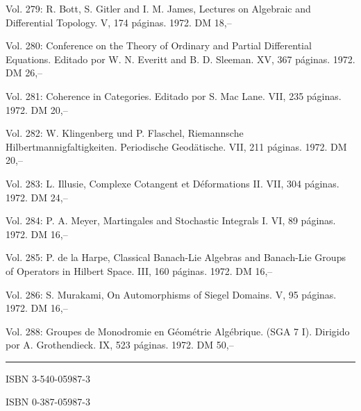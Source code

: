 Vol. 279: R. Bott, S. Gitler and I. M. James, Lectures on Algebraic and Differential Topology. V, 174 páginas. 1972. DM 18,--

Vol. 280: Conference on the Theory of Ordinary and Partial Differential Equations. Editado por W. N. Everitt and B. D. Sleeman. XV, 367 páginas. 1972. DM 26,--

Vol. 281: Coherence in Categories. Editado por S. Mac Lane. VII, 235 páginas. 1972. DM 20,--

Vol. 282: W. Klingenberg und P. Flaschel, Riemannsche Hilbertmannigfaltigkeiten. Periodische Geodätische. VII, 211 páginas. 1972. DM 20,--

Vol. 283: L. Illusie, Complexe Cotangent et Déformations II. VII, 304 páginas. 1972. DM 24,--

Vol. 284: P. A. Meyer, Martingales and Stochastic Integrals I. VI, 89 páginas. 1972. DM 16,--

Vol. 285: P. de la Harpe, Classical Banach-Lie Algebras and Banach-Lie Groups of Operators in Hilbert Space. III, 160 páginas. 1972. DM 16,--

Vol. 286: S. Murakami, On Automorphisms of Siegel Domains. V, 95 páginas. 1972. DM 16,--

Vol. 288: Groupes de Monodromie en Géométrie Algébrique. (SGA 7 I). Dirigido por A. Grothendieck. IX, 523 páginas. 1972. DM 50,--

\noindent\rule{\linewidth}{0.4pt}



ISBN 3-540-05987-3

ISBN 0-387-05987-3
